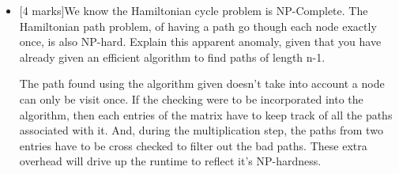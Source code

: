 \documentclass[12pt]{article}
\begin{document}
\begin{enumerate}
\begin{itemize}
\item{}[4 marks]We know the Hamiltonian cycle problem is NP-Complete. The Hamiltonian path problem, of having a path go though each node exactly once, is also NP-hard. Explain this apparent anomaly, given that you have already given an efficient algorithm to find paths of length n-1.

The path found using the algorithm given doesn't take into account a node can only be visit once. If the checking were to be incorporated into the algorithm, then each entries of the matrix have to keep track of all the paths associated with it. And, during the multiplication step, the paths from two entries have to be cross checked to filter out the bad paths. These extra overhead will drive up the runtime to reflect it's NP-hardness.
\end{itemize}


\end{enumerate}
\end{document}
